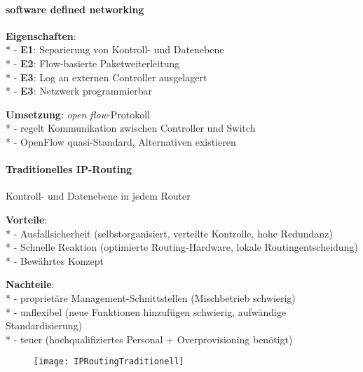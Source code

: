 \paragraph{software defined networking}
\begin{items}
  \item \textbf{Eigenschaften}: \\*
    - \textbf{E1}: Separierung von Kontroll- und Datenebene \\*
    - \textbf{E2}: Flow-basierte Paketweiterleitung \\*
    - \textbf{E3}: Log an externen Controller ausgelagert \\*
    - \textbf{E3}: Netzwerk programmierbar
  \item \textbf{Umsetzung}: \emph{open flow}-Protokoll \\*
    - regelt Kommunikation zwischen Controller und Switch \\*
    - OpenFlow quasi-Standard, Alternativen existieren
\end{items}

\paragraph{Traditionelles IP-Routing}
\begin{items}
  \item Kontroll- und Datenebene in jedem Router
  \item \textbf{Vorteile}: \\*
    - Ausfallsicherheit (selbstorganisiert, verteilte Kontrolle, hohe Redundanz) \\*
    - Schnelle Reaktion (optimierte Routing-Hardware, lokale Routingentscheidung) \\*
    - Bewährtes Konzept
  \item \textbf{Nachteile}: \\*
    - proprietäre Management-Schnittstellen (Mischbetrieb schwierig) \\*
    - unflexibel (neue Funktionen hinzufügen schwierig, aufwändige Standardisierung) \\*
    - teuer (hochqualifiziertes Personal + Overprovisioning benötigt)
\end{items}
\begin{figure}[H]\centering\label{IPRoutingTraditionell}\texttt{[image: IPRoutingTraditionell]}\end{figure}

